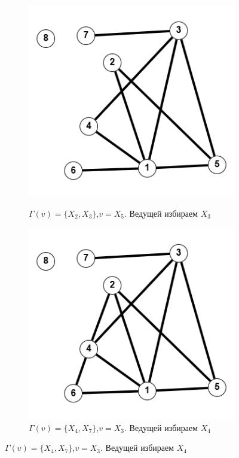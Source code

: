 \documentclass{article}
\begin{document}
\begin{enumerate}
\begin{figure}
\begin{subfigure}[b]{0.2\textwidth}
         \label{fig:3_2}
     \end{subfigure}
     \hfill
     \begin{subfigure}[b]{0.2\textwidth}
         \centering
         \caption*{\footnotesize{$\Gamma(v) = \{X_2,X_3\}$,$v = X_5$. Ведущей избираем $X_3$}}
         \includegraphics[width=\textwidth]{attachments/3/4.png}
         \label{fig:3_3}
     \end{subfigure}
     \hfill
     \begin{subfigure}[b]{0.2\textwidth}
         \centering
         \caption*{\footnotesize{$\Gamma(v) = \{X_4,X_7\}$,$v = X_3$. Ведущей избираем $X_4$}}
         \includegraphics[width=\textwidth]{attachments/3/5.png}

\end{subfigure}
\end{figure}
\end{enumerate}
\end{document}

